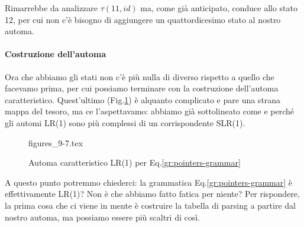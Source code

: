 \documentclass[class=book, crop=false, oneside, 12pt]{standalone}
\begin{document}
Rimarrebbe da analizzare \(\tau(11, id)\) ma, come già anticipato, conduce allo stato 12, per cui non c'è bisogno di aggiungere un quattordicesimo stato al nostro automa.

\paragraph{Costruzione dell'automa}
Ora che abbiamo gli stati non c'è più nulla di diverso rispetto a quello che facevamo prima, per cui possiamo terminare con la costruzione dell'automa caratteristico. Quest'ultimo (Fig.\ref{fig:pointers-automaton}) è alquanto complicato e pare una strana mappa del tesoro, ma ce l'aspettavamo: abbiamo già sottolineato come e perché gli automi LR(1) sono più complessi di un corrispondente SLR(1).
\begin{figure}[H]
    \centering
	{figures_9-7.tex}
    \caption{Automa caratteristico LR(1) per Eq.\ref{gr:pointers-grammar}}
    \label{fig:pointers-automaton}
\end{figure}
A questo punto potremmo chiederci: la grammatica Eq.\ref{gr:pointers-grammar} è effettivamente LR(1)? Non è che abbiamo fatto fatica per niente? Per rispondere, la prima cosa che ci viene in mente è costruire la tabella di parsing a partire dal nostro automa, ma possiamo essere più scaltri di così.
\end{document}
